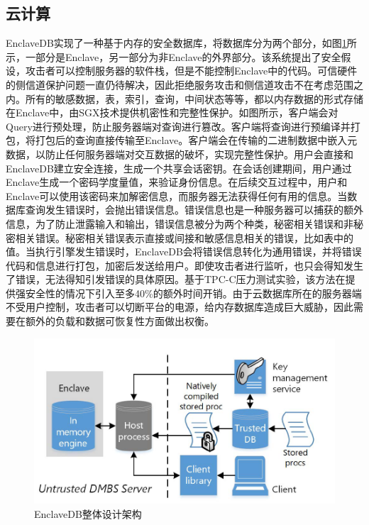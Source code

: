 \documentclass{source/Paper}
\begin{document}
        \subsection{云计算}
        EnclaveDB\cite{priebe2018enclavedb}实现了一种基于内存的安全数据库，将数据库分为两个部分，如图\ref{enclavedb}所示，一部分是Enclave，另一部分为非Enclave的外界部分。该系统提出了安全假设，攻击者可以控制服务器的软件栈，但是不能控制Enclave中的代码。可信硬件的侧信道保护问题一直仍待解决，因此拒绝服务攻击和侧信道攻击不在考虑范围之内。所有的敏感数据，表，索引，查询，中间状态等等，都以内存数据的形式存储在Enclave中，由SGX技术提供机密性和完整性保护。如图所示，客户端会对Query进行预处理，防止服务器端对查询进行篡改。客户端将查询进行预编译并打包，将打包后的查询直接传输至Enclave。客户端会在传输的二进制数据中嵌入元数据，以防止任何服务器端对交互数据的破坏，实现完整性保护。用户会直接和EnclaveDB建立安全连接，生成一个共享会话密钥。在会话创建期间，用户通过Enclave生成一个密码学度量值，来验证身份信息。在后续交互过程中，用户和Enclave可以使用该密码来加解密信息，而服务器无法获得任何有用的信息。当数据库查询发生错误时，会抛出错误信息。错误信息也是一种服务器可以捕获的额外信息，为了防止泄露输入和输出，错误信息被分为两个种类，秘密相关错误和非秘密相关错误。秘密相关错误表示直接或间接和敏感信息相关的错误，比如表中的值。当执行引擎发生错误时，EnclaveDB会将错误信息转化为通用错误，并将错误代码和信息进行打包，加密后发送给用户。即使攻击者进行监听，也只会得知发生了错误，无法得知引发错误的具体原因。基于TPC-C压力测试实验，该方法在提供强安全性的情况下引入至多40\%的额外时间开销。由于云数据库所在的服务器端不受用户控制，攻击者可以切断平台的电源，给内存数据库造成巨大威胁，因此需要在额外的负载和数据可恢复性方面做出权衡。
        \begin{figure}[H]
            \centering
            \includegraphics[width=0.7\linewidth]{pic/enclavedb.png}
            \caption{EnclaveDB整体设计架构}
            \label{enclavedb}
        \end{figure}
        
        
\end{document}
